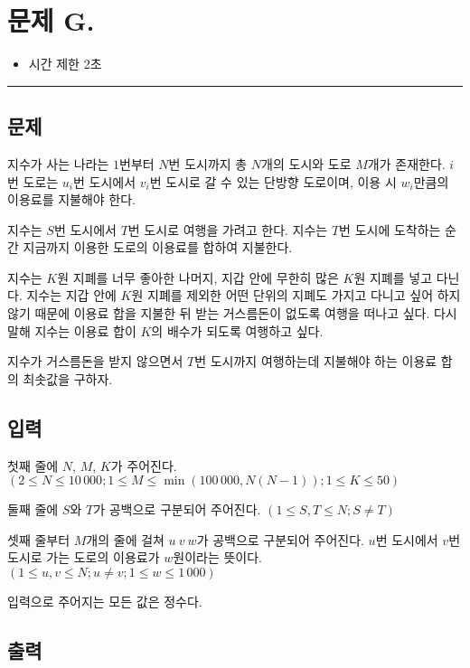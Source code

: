 \newpage
\section*{{\Large 문제 G.} }

\begin{itemize}
    \item 시간 제한 \tabto{2cm} 2초
\end{itemize}

\hrule

\subsection*{문제}

지수가 사는 나라는 $1$번부터 $N$번 도시까지 총 $N$개의 도시와 도로 $M$개가 존재한다. $i$번 도로는 $u_{i}$번 도시에서 $v_{i}$번 도시로 갈 수 있는 단방향 도로이며, 이용 시 $w_{i}$만큼의 이용료를 지불해야 한다.

지수는 $S$번 도시에서 $T$번 도시로 여행을 가려고 한다. 지수는 $T$번 도시에 도착하는 순간 지금까지 이용한 도로의 이용료를 합하여 지불한다.

지수는 $K$원 지폐를 너무 좋아한 나머지, 지갑 안에 무한히 많은 $K$원 지폐를 넣고 다닌다. 지수는 지갑 안에 $K$원 지폐를 제외한 어떤 단위의 지폐도 가지고 다니고 싶어 하지 않기 때문에 이용료 합을 지불한 뒤 받는 거스름돈이 없도록 여행을 떠나고 싶다. 다시 말해 지수는 이용료 합이 $K$의 배수가 되도록 여행하고 싶다.

지수가 거스름돈을 받지 않으면서 $T$번 도시까지 여행하는데 지불해야 하는 이용료 합의 최솟값을 구하자.

\subsection*{입력}

첫째 줄에 $N$, $M$, $K$가 주어진다. $(2\leq N\leq 10\,000; 1\leq M\leq \min\left(100\,000, N(N-1)\right); 1\leq K\leq 50)$

둘째 줄에 $S$와 $T$가 공백으로 구분되어 주어진다. $(1\leq S,T\leq N;S\neq T)$

셋째 줄부터 $M$개의 줄에 걸쳐 $u\ v\ w$가 공백으로 구분되어 주어진다. $u$번 도시에서 $v$번 도시로 가는 도로의 이용료가 $w$원이라는 뜻이다. $(1 \leq u,v \leq N; u\neq v; 1\leq w \leq 1\,000)$

입력으로 주어지는 모든 값은 정수다.

\subsection*{출력}

